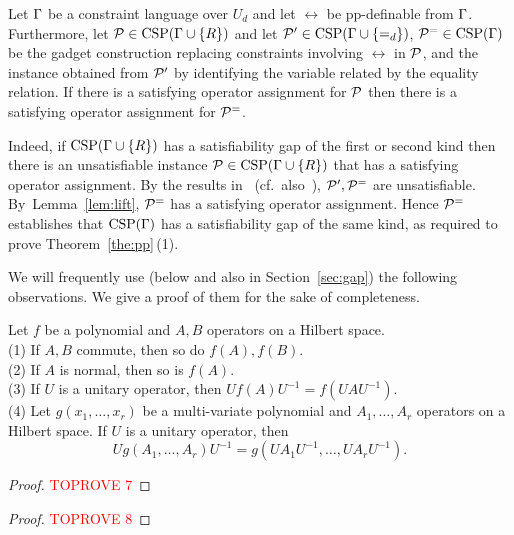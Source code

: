 \documentclass[11pt,letter]{article}
\begin{document}
\begin{lemma}\label{lem:lift}
  Let $\Gamma$ be a constraint language over $U_d$ and let $\rel$ be pp-definable
  from $\Gamma$. Furthermore, let ${\mathcal P}\in{\rm CSP}(\Gamma\cup\{R\})$ and let
  ${\mathcal P}'\in{\rm CSP}(\Gamma\cup\{=_d\})$, ${\mathcal P}^=\in{\rm CSP}(\Gamma)$ be the gadget construction replacing constraints involving
  $\rel$ in ${\mathcal P}$, and the instance obtained from ${\mathcal P}'$ by identifying the variable related by the equality relation. If there is a satisfying operator assignment for ${\mathcal P}$ then there is a satisfying operator assignment for ${\mathcal P}^=$. 
\end{lemma}

Indeed, if ${\rm CSP}(\Gamma\cup\{R\})$ has a satisfiability gap of the first or second kind then there is an unsatisfiable instance ${\mathcal P}\in{\rm CSP}(\Gamma\cup\{R\})$ that has a satisfying operator assignment. By the results in~\cite{Bulatov05:classifying} (cf.~also~\cite{BKW17}), ${\mathcal P}',{\mathcal P}^=$ are unsatisfiable. By~Lemma~\ref{lem:lift}, ${\mathcal P}^=$ has a satisfying operator assignment. Hence ${\mathcal P}^=$ establishes that ${\rm CSP}(\Gamma)$ has a satisfiability gap of the same kind, as required to prove Theorem~\ref{the:pp}\,(1).

We will frequently use (below and also in Section~\ref{sec:gap}) the following observations. We give a proof of them for the sake of completeness.

\begin{lemma}\label{lem:matrix-polys}
Let $f$ be a polynomial and $A,B$ operators on a Hilbert space.\\[2mm]
(1) If $A,B$ commute, then so do $f(A),f(B)$.\\
(2) If $A$ is normal, then so is $f(A)$.\\
(3) If $U$ is a unitary operator, then $Uf(A)U^{-1}=f(UAU^{-1})$.\\[1mm]
(4) Let $g(x_1,\dots,x_r)$ be a multi-variate polynomial and $A_1,\dots,A_r$
  operators on a Hilbert space. If $U$ is a unitary operator, then 
\[
Ug(A_1,\dots,A_r)U^{-1}=g(UA_1U^{-1},\dots,UA_rU^{-1}).
\]
\end{lemma}

\begin{proof}\textcolor{red}{TOPROVE 7}\end{proof}




\begin{proof}\textcolor{red}{TOPROVE 8}\end{proof}
\end{document}
